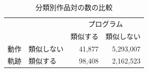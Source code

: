 \documentclass[T,J]{fose} %
\begin{document}
\begin{table}[t]
    \centering
    \caption{分類別作品対の数の比較}
    \begin{tabular}{c|l|r|r}
        \hline
        \multicolumn{2}{c|}{}& \multicolumn{2}{c}{プログラム} \\ \cline{3-4}
        \multicolumn{2}{c|}{}& \multicolumn{1}{c|}{類似する} & \multicolumn{1}{c}{類似しない} \\
        \hline
        動作&類似しない & 41,877 & 5,293,007 \\
        軌跡&類似する & 98,408 & 2,162,523 \\ \cline{2-4}
        \hline
    \end{tabular}
    \label{table:programs-classification}




\end{table}
\end{document}
